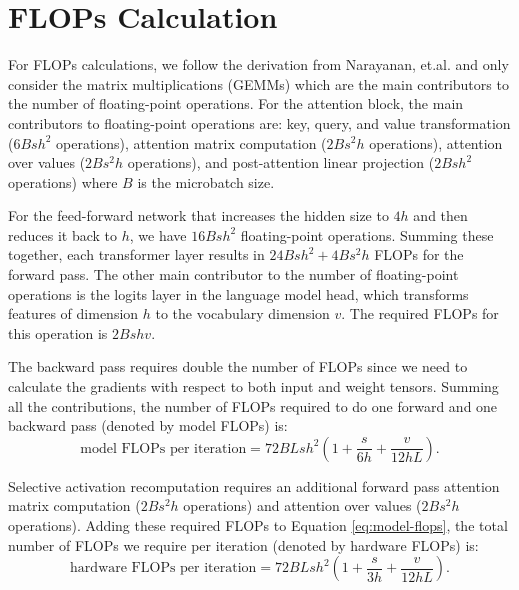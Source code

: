 \documentclass{article}
\begin{document}




\appendix


\section{FLOPs Calculation}
\label{sec:app-FLOPs}

For FLOPs calculations, we follow the derivation from Narayanan, et.al.\cite{megatron-pipeline} and only consider the matrix multiplications (GEMMs) which are the main contributors to the number of floating-point operations. For the attention block, the main contributors to floating-point operations are: key, query, and value transformation ($6Bsh^2$ operations), attention matrix computation ($2Bs^2h$ operations), attention over values ($2Bs^2h$ operations), and post-attention linear projection ($2Bsh^2$ operations) where $B$ is the microbatch size.

For the feed-forward network that increases the hidden size to $4h$ and then reduces it back to $h$,  we have $16Bsh^2$ floating-point operations. Summing these together, each transformer layer results in $24Bsh^2 + 4Bs^2h$ FLOPs for the forward pass. The other main contributor to the number of floating-point operations is the logits layer in the language model head, which transforms features of dimension $h$ to the vocabulary dimension $v$. The required FLOPs for this operation is $2Bshv$.

The backward pass requires double the number of FLOPs since we need to calculate the gradients with respect to both input and weight tensors. Summing all the contributions, the number of FLOPs required to do one forward and one backward pass (denoted by model FLOPs) is:
\begin{equation}
    \text{model FLOPs per iteration} = 72BLsh^2\left( 1 + \frac{s}{6h} + \frac{v}{12hL}\right).
    \label{eq:model-flops}
\end{equation}

Selective activation recomputation requires an additional forward pass attention matrix computation ($2Bs^2h$ operations) and attention over values ($2Bs^2h$ operations). Adding these required FLOPs to Equation \ref{eq:model-flops}, the total number of FLOPs we require per iteration (denoted by hardware FLOPs) is:
\begin{equation}
    \text{hardware FLOPs per iteration} = 72BLsh^2\left( 1 + \frac{s}{3h} + \frac{v}{12hL}\right).
    \label{eq:hardware-flops}
\end{equation}
\end{document}
